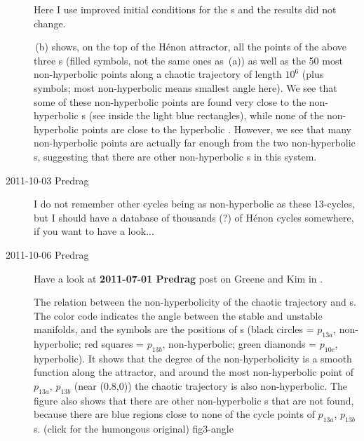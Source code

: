 \begin{description}
Here I use improved initial conditions for the \po s and the results did
not change.

\,(b) shows, on the top of the H\'enon attractor,
all the points of the above three \po s (filled symbols, not the same ones
as \,(a)) as well as the 50 most non-hyperbolic
points along a chaotic trajectory of length $10^6$ (plus symbols; most
non-hyperbolic means smallest angle here). We see that some of these
non-hyperbolic points are found very close to the non-hyperbolic \po s
(see inside the light blue rectangles), while none of the non-hyperbolic
points are close to the hyperbolic \po. However, we see that many
non-hyperbolic points are actually far enough from the two non-hyperbolic
\po s, suggesting that there are other non-hyperbolic \po s in this system.

\item[2011-10-03 Predrag] I do not remember other cycles being as
non-hyperbolic as these 13-cycles, but I should have a database of
thousands (?) of  H\'enon cycles somewhere, if you want to have a look...

\item[2011-10-06 Predrag]
Have a look at {\bf 2011-07-01 Predrag} post on Greene and Kim
in .

{}{
The relation between the non-hyperbolicity
of the chaotic trajectory and \po s. The color code indicates the angle
between the stable and unstable manifolds, and the symbols are the
positions of \po s (black circles = $p_{13a}$, non-hyperbolic; red squares =
$p_{13b}$, non-hyperbolic; green diamonds = $p_{10c}$, hyperbolic). It
shows that the degree of the non-hyperbolicity is a smooth function along
the attractor, and around the most non-hyperbolic point of  $p_{13a}$, $p_{13b}$
(near (0.8,0)) the chaotic trajectory is also
non-hyperbolic. The figure also shows that there are other non-hyperbolic
\po s that are not found, because there are blue regions close to none of
the cycle points of $p_{13a}$, $p_{13b}$ \po s.
(click  for
the humongous original)
}{fig3-angle}


\end{description}

